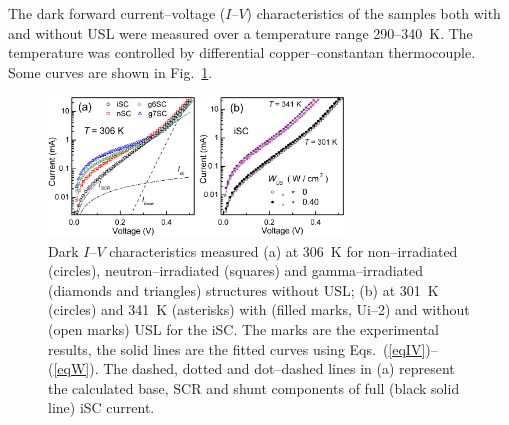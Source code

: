\documentclass[aip,jap, amsmath,amssymb,reprint]{revtex4-1}
\begin{document}


The dark forward current--voltage ($I$--$V$) characteristics of the samples both with and without USL were measured over a temperature range 290--340~K.
The temperature was controlled by differential copper--constantan thermocouple.
Some curves are shown in Fig.~\ref{figIV}.


\begin{figure}
\includegraphics[width=0.7\textwidth]{olikhFig1}%
\caption{\label{figIV}
Dark $I$--$V$ characteristics measured (a) at 306~K for non--irradiated (circles), neutron--irradiated (squares) and gamma--irradiated (diamonds and triangles) structures without USL;
(b) at 301~K (circles) and 341~K (asterisks) with (filled marks, Ui--2) and without (open marks) USL for the iSC.
The marks are the experimental results, the solid lines are the fitted curves using Eqs.~(\ref{eqIV})--(\ref{eqW}).
The dashed, dotted and dot--dashed lines in (a) represent the calculated base, SCR and shunt components of full (black solid line) iSC current.
}%
\end{figure}
\end{document}
